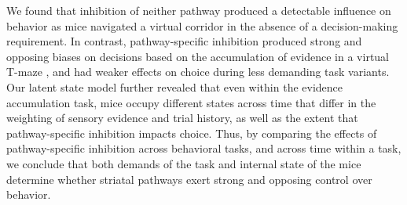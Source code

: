 We found that inhibition of neither pathway produced a detectable influence on behavior as mice navigated a virtual corridor in the absence of a decision-making requirement. In contrast, pathway-specific inhibition produced strong and opposing biases on decisions based on the accumulation of evidence in a virtual T-maze \cite{pinto_accumulation--evidence_2018}, and had weaker effects on choice during less demanding task variants. Our latent state model further revealed that even within the evidence accumulation task, mice occupy different states across time that differ in the weighting of sensory evidence and trial history, as well as the extent that pathway-specific inhibition impacts choice. Thus, by comparing the effects of pathway-specific inhibition across behavioral tasks, and across time within a task, we conclude that both demands of the task and internal state of the mice determine whether striatal pathways exert strong and opposing control over behavior. 